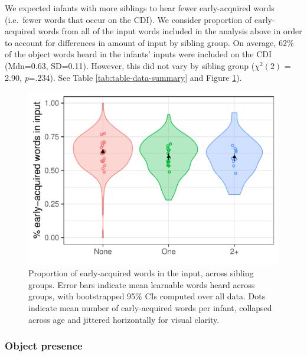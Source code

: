 \documentclass[
  english,
  man,floatsintext]{apa6}
\begin{document}
We expected infants with more siblings to hear fewer early-acquired words (i.e.~fewer words that occur on the CDI). We consider proportion of early-acquired words from all of the input words included in the analysis above in order to account for differences in amount of input by sibling group. On average, 62\% of the object words heard in the infants' inputs were included on the CDI (Mdn=0.63, SD=0.11). However, this did not vary by sibling group (\(\chi^2 (2)\) = 2.90, \emph{p}=.234). See Table \ref{tab:table-data-summary} and Figure \ref{fig:Figure-in-cdi}).

\begin{figure}
\centering
\includegraphics{SiblingsStudyText_files/figure-latex/Figure-in-cdi-1.pdf}
\caption{\label{fig:Figure-in-cdi}Proportion of early-acquired words in the input, across sibling groups. Error bars indicate mean learnable words heard across groups, with bootstrapped 95\% CIs computed over all data. Dots indicate mean number of early-acquired words per infant, collapsed across age and jittered horizontally for visual clarity.}
\end{figure}

\hypertarget{object-presence}{%
\subsubsection{Object presence}\label{object-presence}}
\end{document}
